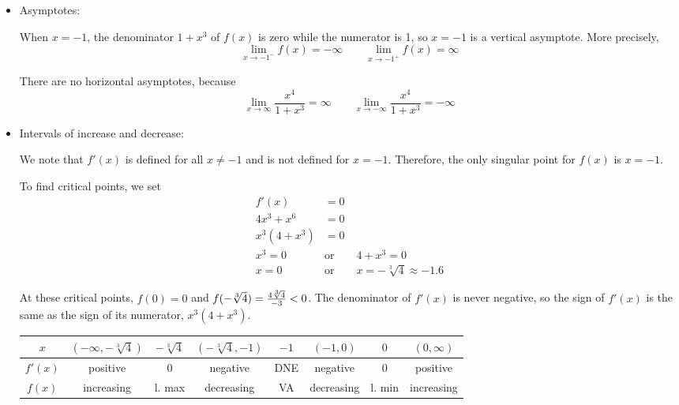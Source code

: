 \begin{solution}
\begin{itemize}
\item  Asymptotes:

When $x=-1$, the denominator $1+x^3$ of $f(x)$ is zero while the numerator is 1,  so $x=-1$ is a vertical asymptote. More precisely,
\[\lim_{x \to -1^-}f(x)=-\infty
\qquad
\lim_{x \to -1^+}f(x)=\infty\]

There are no horizontal asymptotes, because
\[\lim_{x \to \infty} \frac{x^4}{1+x^3}=\infty \qquad \lim_{x \to- \infty} \frac{x^4}{1+x^3}=-\infty\]

\item  Intervals of increase and decrease:

We note that $f'(x)$ is defined for all $x \neq -1$ and is not defined for $x=-1$. Therefore, the only singular point for $f(x)$ is $x=-1$.

To find critical points, we set
\begin{align*}
f'(x)&=0\\
4x^3+x^6 &=0\\
x^3(4+x^3)&=0\\
x^3=0 \qquad &\mbox{or} \qquad 4+x^3=0\\
x=0 \qquad &\mbox{or} \qquad x=-\sqrt[3]{4}\approx-1.6
\end{align*}

At these critical points, $f(0)=0$ and
$f(-\root 3 \of 4)=\frac{4\root 3 \of 4}{-3}<0$.
The denominator of $f'(x)$ is never negative, so the sign of $f'(x)$ is the same as the sign of its numerator, $x^3(4+x^3)$.

\begin{center}
 \begin{tabular}{|c||c|c|c|c|c|c|c|}
\hline
$x$  & $(-\infty,-\sqrt[3]{4})$ &$-\sqrt[3]{4}$ & $(-\sqrt[3]{4},-1)$ & $-1$ &$(-1,0)$
&$0$&$(0,\infty)$\\
\hline
$f'(x)$  &  positive &0  &negative  &DNE &negative &0&positive \\
\hline
$f(x)$ & increasing & l. max&decreasing&VA &decreasing&l. min&increasing\\
\hline
 \end{tabular}
\end{center}


\end{itemize}
\end{solution}
